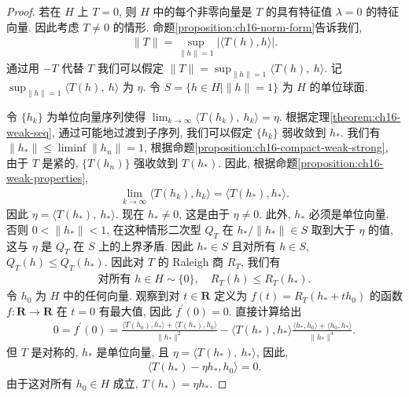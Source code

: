 \documentclass[../../main.tex]{subfiles}
\begin{document}
\begin{proof}
若在 $H$ 上 $T=0$, 则 $H$ 中的每个非零向量是 $T$ 的具有特征值 $\lambda=0$ 的特征向量. 因此考虑 $T\neq 0$ 的情形. 命题\cref{proposition:ch16-norm-form}告诉我们,
\begin{align*}
\|T\|=\sup_{\|h\|=1}|\langle T(h),h\rangle|.
\end{align*}
通过用 $-T$ 代替 $T$ 我们可以假定 $\|T\|=\sup_{\|h\|=1}\langle T(h),\ h\rangle$. 记 $\sup_{\|h\|=1}\langle T(h),\ h\rangle$ 为 $\eta$. 令 $S=\{h\in H\mid\|h\|=1\}$ 为 $H$ 的单位球面.

令 $\{h_{k}\}$ 为单位向量序列使得 $\lim_{k\to\infty}\langle T(h_{k}),\ h_{k}\rangle=\eta$. 根据定理\cref{theorem:ch16-weak-seq}, 通过可能地过渡到子序列, 我们可以假定 $\{h_{k}\}$ 弱收敛到 $h_{*}$. 我们有 $\|h_{*}\|\leqslant\liminf\|h_{n}\|=1$, 根据命题\cref{proposition:ch16-compact-weak-strong}, 由于 $T$ 是紧的, $\{T(h_{n})\}$ 强收敛到 $T(h_{*})$. 因此, 根据命题\cref{proposition:ch16-weak-properties},
\begin{align*}
\lim_{k\to\infty}\langle T(h_{k}),h_{k}\rangle=\langle T(h_{*}),h_{*}\rangle.
\end{align*}
因此 $\eta=\langle T(h_{*}),\ h_{*}\rangle$. 现在 $h_{*}\neq 0$, 这是由于 $\eta\neq 0$. 此外, $h_{*}$ 必须是单位向量. 否则 $0<\|h_{*}\|<1$, 在这种情形二次型 $Q_{T}$ 在 $h_{*}/\|h_{*}\|\in S$ 取到大于 $\eta$ 的值, 这与 $\eta$ 是 $Q_{T}$ 在 $S$ 上的上界矛盾. 因此 $h_{*}\in S$ 且对所有 $h\in S$, $Q_{T}(h)\leqslant Q_{T}(h_{*})$. 因此对 $T$ 的 Raleigh 商 $R_{T}$, 我们有
\begin{align*}
\text{对所有 }h\in H\sim\{0\},\quad R_{T}(h)\leqslant R_{T}(h_{*}).
\end{align*}
令 $h_{0}$ 为 $H$ 中的任何向量. 观察到对 $t\in\mathbf{R}$ 定义为 $f(t)=R_{T}(h_{*}+th_{0})$ 的函数 $f:\mathbf{R}\to\mathbf{R}$ 在 $t=0$ 有最大值, 因此 $f^{\prime}(0)=0$. 直接计算给出
\begin{align*}
0=f^{\prime}(0)=\frac{\langle T(h_{0}),h_{*}\rangle+\langle T(h_{*}),h_{0}\rangle}{\|h_{*}\|^{2}}-\langle T(h_{*}),h_{*}\rangle\frac{\langle h_{*},h_{0}\rangle+\langle h_{0},h_{*}\rangle}{\|h_{*}\|^{4}}.
\end{align*}
但 $T$ 是对称的, $h_{*}$ 是单位向量, 且 $\eta=\langle T(h_{*}),\ h_{*}\rangle$, 因此,
\begin{align*}
\langle T(h_{*})-\eta h_{*},h_{0}\rangle=0.
\end{align*}
由于这对所有 $h_{0}\in H$ 成立, $T(h_{*})=\eta h_{*}$.
\end{proof}
\end{document}
